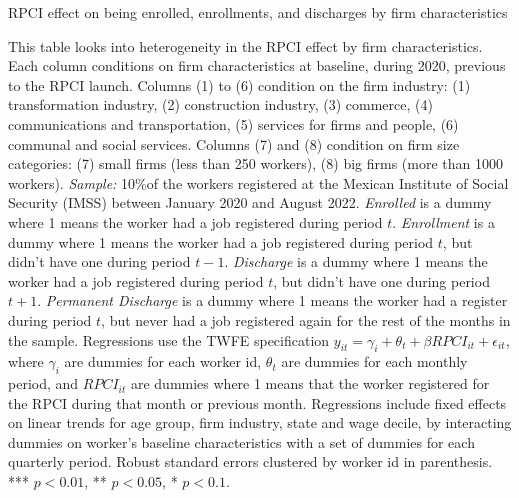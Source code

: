 \documentclass[oneside,11pt]{article}
\begin{document}
\begin{landscape}

\begin{table}[H]
    \caption{RPCI effect on being enrolled, enrollments, and discharges by firm characteristics}
    \label{twfe_job_hetero_firm_char}
    \begin{center}
    \scriptsize{}
    \end{center}
\end{table}
\tiny{
\noindent This table looks into heterogeneity in the RPCI effect by firm characteristics. Each column conditions on firm characteristics at baseline, during 2020, previous to the RPCI launch. Columns (1) to (6) condition on the firm industry: (1) transformation industry, (2) construction industry, (3) commerce, (4) communications and transportation, (5) services for firms and people, (6) communal and social services. Columns (7) and (8) condition on firm size categories: (7) small firms (less than 250 workers), (8) big firms (more than 1000 workers). \textit{Sample:} 10\%of the workers registered at the Mexican Institute of Social Security (IMSS) between January 2020 and August 2022. \textit{Enrolled} is a dummy where 1 means the worker had a job registered during period $t$. \textit{Enrollment} is a dummy where 1 means the worker had a job registered during period $t$, but didn't have one during period $t-1$. \textit{Discharge} is a dummy where 1 means the worker had a job registered during period $t$, but didn't have one during period $t+1$. \textit{Permanent Discharge} is a dummy where 1 means the worker had a register during period $t$, but never had a job registered again for the rest of the months in the sample. Regressions use the TWFE specification $y_{it} = \gamma_{i} + \theta_{t}+ \beta RPCI_{it} +\epsilon_{it}$, where $\gamma_{i}$ are dummies for each worker id, $\theta_{t}$ are dummies for each monthly period, and $RPCI_{it}$ are dummies where 1 means that the worker registered for the RPCI during that month or previous month. Regressions include fixed effects on linear trends for age group, firm industry, state and wage decile, by interacting dummies on worker's baseline characteristics with a set of dummies for each quarterly period. Robust standard errors clustered by worker id in parenthesis. *** $p<0.01$, ** $p<0.05$, * $p<0.1$.
}

\end{landscape}
\end{document}
